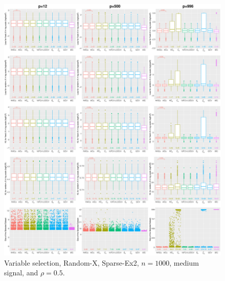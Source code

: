 \begin{figure}[!ht]
\centering
\includegraphics[width=\textwidth]{figures/supplement/randomx/subset_selection/Sparse-Ex2_n1000_msnr_rho05.eps}
\caption{Variable selection, Random-X, Sparse-Ex2, $n=1000$, medium signal, and $\rho=0.5$.}
\end{figure}
\clearpage
